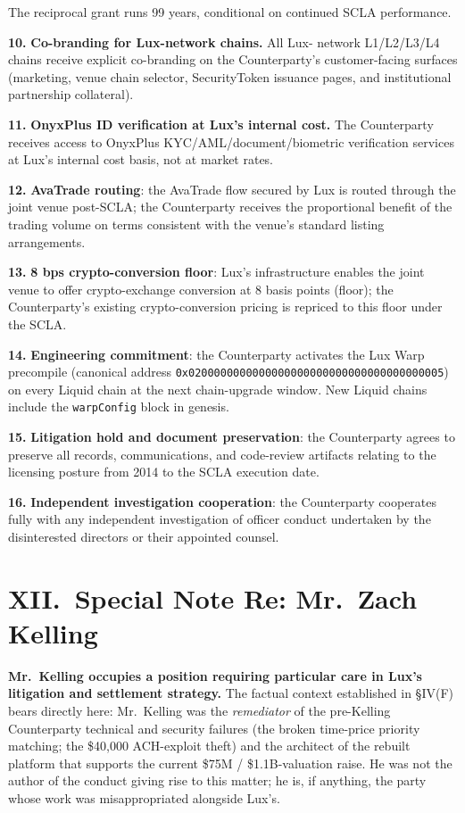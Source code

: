 \documentclass[11pt,letterpaper]{article}
\begin{document}
The reciprocal grant runs 99 years, conditional on continued SCLA
performance.

\textbf{10.} \textbf{Co-branding for Lux-network chains.} All Lux-
network L1/L2/L3/L4 chains receive explicit co-branding on the
Counterparty's customer-facing surfaces (marketing, venue chain
selector, SecurityToken issuance pages, and institutional partnership
collateral).

\textbf{11.} \textbf{OnyxPlus ID verification at Lux's internal
cost.} The Counterparty receives access to OnyxPlus
KYC/AML/document/biometric verification services at Lux's internal
cost basis, not at market rates.

\textbf{12.} \textbf{AvaTrade routing}: the AvaTrade flow secured by
Lux is routed through the joint venue post-SCLA; the Counterparty
receives the proportional benefit of the trading volume on terms
consistent with the venue's standard listing arrangements.

\textbf{13.} \textbf{8 bps crypto-conversion floor}: Lux's
infrastructure enables the joint venue to offer crypto-exchange
conversion at 8 basis points (floor); the Counterparty's existing
crypto-conversion pricing is repriced to this floor under the SCLA.

\textbf{14.} \textbf{Engineering commitment}: the Counterparty
activates the Lux Warp precompile (canonical address
\texttt{0x0200000000000000000000000000000000000005}) on every Liquid
chain at the next chain-upgrade window. New Liquid chains include
the \texttt{warpConfig} block in genesis.

\textbf{15.} \textbf{Litigation hold and document preservation}: the
Counterparty agrees to preserve all records, communications, and
code-review artifacts relating to the licensing posture from 2014 to
the SCLA execution date.

\textbf{16.} \textbf{Independent investigation cooperation}: the
Counterparty cooperates fully with any independent investigation of
officer conduct undertaken by the disinterested directors or their
appointed counsel.

\section*{XII.\ Special Note Re: Mr.\ Zach Kelling}

\textbf{Mr.\ Kelling occupies a position requiring particular care
in Lux's litigation and settlement strategy.} The factual context
established in \S IV(F) bears directly here: Mr.\ Kelling was the
\emph{remediator} of the pre-Kelling Counterparty technical and
security failures (the broken time-price priority matching; the
\$40,000 ACH-exploit theft) and the architect of the rebuilt platform
that supports the current \$75M / \$1.1B-valuation raise. He was not the author
of the conduct giving rise to this matter; he is, if anything, the
party whose work was misappropriated alongside Lux's.
\end{document}

